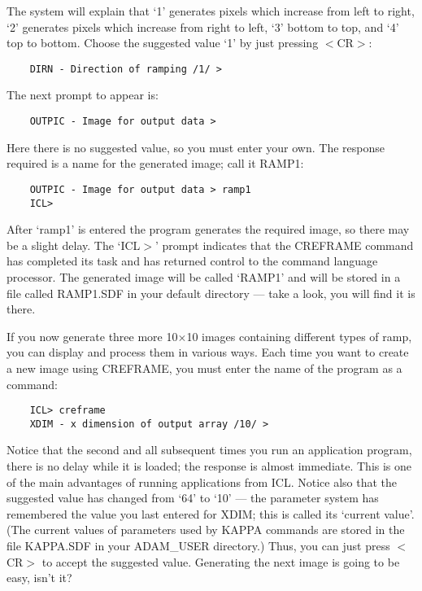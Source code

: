 The system will explain that `1' generates pixels which increase from left to
right, `2' generates pixels which increase from right to left, `3' bottom to
top, and `4' top to bottom.
Choose the suggested value `1' by just pressing $<$CR$>$:

\begin{small}
\begin{verbatim}
    DIRN - Direction of ramping /1/ >
\end{verbatim}
\end{small}

The next prompt to appear is:

\begin{small}
\begin{verbatim}
    OUTPIC - Image for output data >
\end{verbatim}
\end{small}

Here there is no suggested value, so you must enter your own.
The response required is a name for the generated image; call it RAMP1:

\begin{small}
\begin{verbatim}
    OUTPIC - Image for output data > ramp1
    ICL>
\end{verbatim}
\end{small}

After `ramp1' is entered the program generates the required image, so there
may be a slight delay.
The `ICL$>$' prompt indicates that the CREFRAME command has completed its task
and has returned control to the command language processor.
The generated image will be called `RAMP1' and will be stored in a file called
RAMP1.SDF in your default directory --- take a look, you will find it is there.

If you now generate three more 10$\times$10 images containing different types
of ramp, you can display and process them in various ways.
Each time you want to create a new image using CREFRAME, you must enter the name
of the program as a command:

\begin{small}
\begin{verbatim}
    ICL> creframe
    XDIM - x dimension of output array /10/ >
\end{verbatim}
\end{small}

Notice that the second and all subsequent times you run an application program,
there is no delay while it is loaded; the response is almost immediate.
This is one of the main advantages of running applications from ICL.
Notice also that the suggested value has changed from `64' to `10' --- the
parameter system has remembered the value you last entered for XDIM; this is
called its `current value'.
(The current values of parameters used by KAPPA commands are stored in the file
KAPPA.SDF in your ADAM\_USER directory.)
Thus, you can just press $<$CR$>$ to accept the suggested value.
Generating the next image is going to be easy, isn't it?

